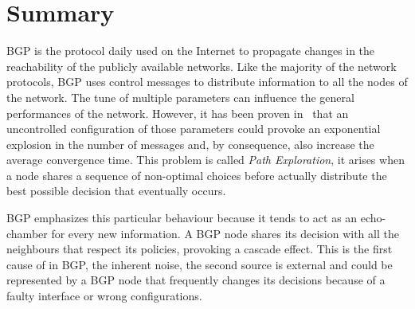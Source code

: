 \chapter*{Summary} %
\label{cha:summary}




\ac{BGP} is the protocol daily used on the Internet to propagate changes in the
reachability of the publicly available networks.
Like the majority of the network protocols, \ac{BGP} uses control messages to
distribute information to all the nodes of the network.
The tune of multiple parameters can influence the general performances of the
network.
However, it has been proven in~\cite{fabrikant2011there} that an uncontrolled configuration
of those parameters could provoke an exponential explosion in the number of messages
and, by consequence, also increase the average convergence time.
This problem is called \textit{Path Exploration}, it arises when a node shares
a sequence of non-optimal choices before actually distribute the best possible
decision that eventually occurs.

\ac{BGP} emphasizes this particular behaviour because
it tends to act as an echo-chamber for every new information.
A \ac{BGP} node shares its decision with all the neighbours that respect
its policies, provoking a cascade effect.
This is the first cause of  in \ac{BGP}, the inherent noise, the second
source is external and could be represented by a \ac{BGP} node that frequently
changes its decisions because of a faulty interface or wrong configurations.

